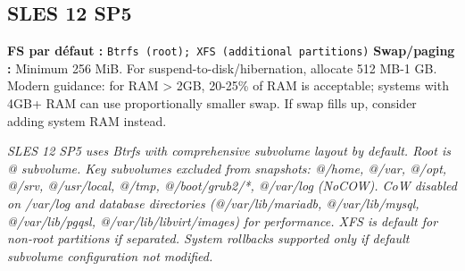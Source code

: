 \documentclass[10pt,a4paper]{article}
\begin{document}
\subsection{SLES 12 SP5}
\noindent\small \textbf{FS par d\'efaut :} \texttt{Btrfs (root); XFS (additional partitions)} \quad\textbullet\quad \textbf{Swap/paging :} Minimum 256 MiB. For suspend-to-disk/hibernation, allocate 512 MB-1 GB. Modern guidance: for RAM > 2GB, 20-25\% of RAM is acceptable; systems with 4GB+ RAM can use proportionally smaller swap. If swap fills up, consider adding system RAM instead.\normalsize\par\smallskip
\noindent\small\textit{SLES 12 SP5 uses Btrfs with comprehensive subvolume layout by default. Root is @ subvolume. Key subvolumes excluded from snapshots: @/home, @/var, @/opt, @/srv, @/usr/local, @/tmp, @/boot/grub2/*, @/var/log (NoCOW). CoW disabled on /var/log and database directories (@/var/lib/mariadb, @/var/lib/mysql, @/var/lib/pgqsl, @/var/lib/libvirt/images) for performance. XFS is default for non-root partitions if separated. System rollbacks supported only if default subvolume configuration not modified.}\normalsize\par\smallskip
\end{document}
